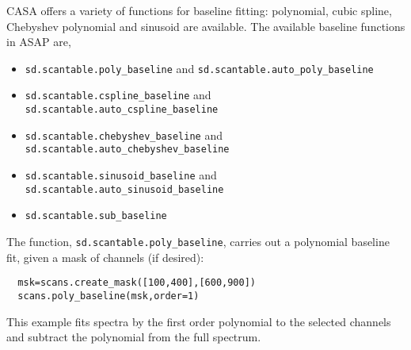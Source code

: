CASA offers a variety of functions for baseline fitting: polynomial, 
cubic spline, Chebyshev polynomial and sinusoid are available.
The available baseline functions in ASAP are,
\begin{itemize}
\item {\tt sd.scantable.poly\_baseline} and 
{\tt sd.scantable.auto\_poly\_baseline}
\item {\tt sd.scantable.cspline\_baseline} and 
{\tt sd.scantable.auto\_cspline\_baseline} 
\item {\tt sd.scantable.chebyshev\_baseline} and
{\tt sd.scantable.auto\_chebyshev\_baseline} 
\item {\tt sd.scantable.sinusoid\_baseline} and
{\tt sd.scantable.auto\_sinusoid\_baseline}
\item {\tt sd.scantable.sub\_baseline}
\end{itemize}


The function, {\tt sd.scantable.poly\_baseline}, carries out a
polynomial baseline fit, given a mask of channels (if desired):
\small
\begin{verbatim}
  msk=scans.create_mask([100,400],[600,900])
  scans.poly_baseline(msk,order=1)
\end{verbatim}
\normalsize
This example fits spectra by the first order polynomial to the selected
channels and subtract the polynomial from the full spectrum.

